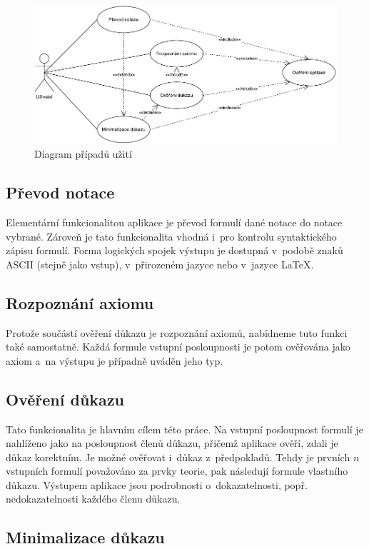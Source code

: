 \documentclass[thesis=B,czech,hidelinks]{thesis}[2012/06/26]
\begin{document}
\begin{figure}
\centering
\caption{Diagram případů užití}
\label{fig:use_cases}
\includegraphics[width=\linewidth]{diagrams/use_cases}
\end{figure}

\subsection{Převod notace}

Elementární funkcionalitou aplikace je převod formulí dané notace do notace vybrané. Zároveň je tato funkcionalita vhodná i~pro kontrolu syntaktického zápisu formulí. Forma logických spojek výstupu je dostupná v~podobě znaků ASCII (stejně jako vstup), v~přirozeném jazyce nebo v~jazyce \LaTeX{}.

\subsection{Rozpoznání axiomu}

Protože součástí ověření důkazu je rozpoznání axiomů, nabídneme tuto funkci také samostatně. Každá formule vstupní posloupnosti je potom ověřována jako axiom a~na výstupu je případně uváděn jeho typ.

\subsection{Ověření důkazu}

Tato funkcionalita je hlavním cílem této práce. Na vstupní posloupnost formulí je nahlíženo jako na posloupnost členů důkazu, přičemž aplikace ověří, zdali je důkaz korektním. Je možné ověřovat i~důkaz z~předpokladů. Tehdy je prvních $n$ vstupních formulí považováno za prvky teorie, pak následují formule vlastního důkazu. Výstupem aplikace jsou podrobnosti o~dokazatelnosti, popř. nedokazatelnosti každého členu důkazu.

\subsection{Minimalizace důkazu}
\end{document}
